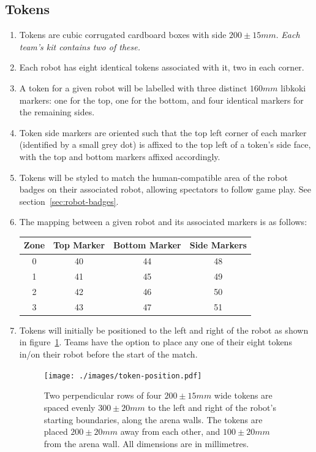 \subsection{Tokens}
\label{sub:Tokens}
\begin{enumerate}
\item Tokens are cubic corrugated cardboard boxes with side $200 \pm 15 mm$.
      \emph{Each team's kit contains two of these.}

\item Each robot has eight identical tokens associated with it, two in each corner.

\item A token for a given robot will be labelled with three distinct $160mm$ libkoki markers: one for the top, one for the bottom, and four identical markers for the remaining sides.

\item Token side markers are oriented such that the top left corner of each marker (identified by a small grey dot) is affixed to the top left of a token's side face, with the top and bottom markers affixed accordingly.

\item Tokens will be styled to match the human-compatible area of the robot badges on their associated robot, allowing spectators to follow game play.
      See section~\ref{sec:robot-badges}.

\item The mapping between a given robot and its associated markers is as follows:

\begin{center}
  \begin{tabular}{cccc}
    \toprule
    \textbf{Zone} & \textbf{Top Marker} & \textbf{Bottom Marker} & \textbf{Side Markers} \\
    \midrule
    0 & 40 & 44 & 48 \\
    1 & 41 & 45 & 49 \\
    2 & 42 & 46 & 50 \\
    3 & 43 & 47 & 51 \\
    \bottomrule
  \end{tabular}
\end{center}

\item Tokens will initially be positioned to the left and right of the robot as shown in figure~\ref{fig:token-position}.
      Teams have the option to place any one of their eight tokens in/on their robot before the start of the match.

\begin{figure}
  \centering
  \texttt{[image: ./images/token-position.pdf]}
  \caption{Two perpendicular rows of four $200 \pm 15mm$ wide tokens are spaced evenly $300 \pm 20mm$ to the left and right of the robot's starting boundaries, along the arena walls.
    The tokens are placed $200 \pm 20mm$ away from each other, and $100 \pm 20mm$ from the arena wall.
           All dimensions are in millimetres.}
  \label{fig:token-position}
\end{figure}

\end{enumerate}

\clearpage
